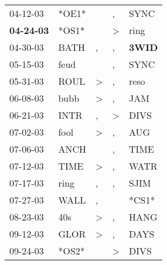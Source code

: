 \begin{supertabular}{p{0.07\textwidth}p{0.06\textwidth}p{0.02\textwidth}p{0.02\textwidth}p{0.06\textwidth}}
          04-12-03\textsuperscript{} &                            *OE1* &                  &             , &           SYNC\textsuperscript{} \\
 \textbf{04-24-03\textsuperscript{}} &                            *OS1* &                  &  \textgreater &           ring\textsuperscript{} \\
          04-30-03\textsuperscript{} &           BATH\textsuperscript{} &                , &             , &  \textbf{3WID\textsuperscript{}} \\
          05-15-03\textsuperscript{} &           feud\textsuperscript{} &                  &             , &           SYNC\textsuperscript{} \\
          05-31-03\textsuperscript{} &           ROUL\textsuperscript{} &     \textgreater &             , &           reso\textsuperscript{} \\
          06-08-03\textsuperscript{} &           bubb\textsuperscript{} &     \textgreater &             , &            JAM\textsuperscript{} \\
          06-21-03\textsuperscript{} &           INTR\textsuperscript{} &                , &  \textgreater &           DIVS\textsuperscript{} \\
          07-02-03\textsuperscript{} &           fool\textsuperscript{} &     \textgreater &             , &            AUG\textsuperscript{} \\
          07-06-03\textsuperscript{} &           ANCH\textsuperscript{} &                  &             , &           TIME\textsuperscript{} \\
          07-12-03\textsuperscript{} &           TIME\textsuperscript{} &     \textgreater &             , &           WATR\textsuperscript{} \\
          07-17-03\textsuperscript{} &           ring\textsuperscript{} &                , &             , &           SJIM\textsuperscript{} \\
          07-27-03\textsuperscript{} &           WALL\textsuperscript{} &                , &               &                            *CS1* \\
          08-23-03\textsuperscript{} &            40s\textsuperscript{} &     \textgreater &             , &           HANG\textsuperscript{} \\
          09-12-03\textsuperscript{} &           GLOR\textsuperscript{} &     \textgreater &             , &           DAYS\textsuperscript{} \\
          09-24-03\textsuperscript{} &                            *OS2* &                  &  \textgreater &           DIVS\textsuperscript{} \\

\end{supertabular}
